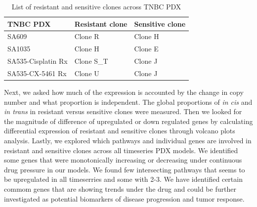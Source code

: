  \begin{table}[htbp]
   
   \centering
   \caption{List of resistant and sensitive clones across TNBC PDX}
     \begin{tabular}{|l|l|l|}
      \hline
     TNBC PDX & Resistant clone & Sensitive clone \\
     \hline
     SA609  & Clone R & Clone H \\
     SA1035 & Clone H & Clone E \\
     SA535-Cisplatin Rx & Clone S\_T & Clone J \\
     SA535-CX-5461 Rx & Clone U & Clone J \\    \hline
     \end{tabular}%
   \label{tab:Listofresistantandsensitiveclones}%
   
  
 \end{table}%

Next, we asked how much of the expression is accounted by the change in copy number and what proportion is independent. The global proportions of \textit{in cis} and \textit{in trans} in resistant versus sensitive clones were measured. Then we looked for the magnitude of difference of upregulated or down regulated genes by calculating differential expression of resistant and sensitive clones through volcano plots analysis. Lastly, we explored which pathways and individual genes are involved in resistant and sensitive clones across all timeseries PDX models. We identified some genes that were monotonically increasing or decreasing under continuous drug pressure in our models. We found few intersecting pathways that seems to be upregulated in all timeserries and some with 2-3. We have identified certain commom genes that are showing trends under the drug and could be further investigated as potential biomarkers of disease progression and tumor response.


